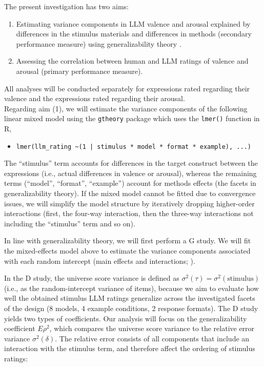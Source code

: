 \documentclass[12pt]{article}
\begin{document}
	\begin{examplebox}
		The present investigation has two aims:
		
		\begin{enumerate}
			\item Estimating variance components in LLM valence and arousal explained by differences in the stimulus materials and differences in methods (secondary performance measure) using generalizability theory \parencite{brennanGeneralizabilityTheory2001}.
			\item Assessing the correlation between human and LLM ratings of valence and arousal (primary performance measure).
		\end{enumerate}
		
		All analyses will be conducted separately for expressions rated regarding their valence and the expressions rated regarding their arousal. \\
		
		Regarding aim (1), we will estimate the variance components of the following linear mixed model using the \texttt{gtheory} package \parencite{mooreGtheoryApplyGeneralizability2016} which uses the \verb|lmer()| function in R,
		
		\begin{itemize}
			\item \texttt{lmer(llm\_rating \textasciitilde  (1 | stimulus * model * format * example), ...)}
		\end{itemize}
		
		The ``stimulus'' term accounts for differences in the target construct between the expressions (i.e., actual differences in valence or arousal), whereas the remaining terms (``model'', ``format'', ``example'') account for methods effects (the facets in generalizability theory). If the mixed model cannot be fitted due to convergence issues, we will simplify the model structure by iteratively dropping higher-order interactions (first, the four-way interaction, then the three-way interactions not including the “stimulus” term and so on). 
		
		In line with generalizability theory, we will first perform a G study. We will fit the mixed-effects model above to estimate the variance components associated with each random intercept (main effects and interactions; \cite{brennanGeneralizabilityTheory2001}).
		
		In the D study, the universe score variance is defined as $\sigma^2(\tau)=\sigma^2(\text{stimulus})$ (i.e., as the random-intercept variance of items), because we aim to evaluate how well the obtained stimulus LLM ratings generalize across the investigated facets of the design (8 models, 4 example conditions, 2 response formats). The D study yields two types of coefficients. Our analysis will focus on the generalizability coefficient $E\rho^2$, which compares the universe score variance to the relative error variance $\sigma^2(\delta)$. The relative error consists of all components that include an interaction with the stimulus term, and therefore affect the ordering of stimulus ratings:
		

\end{examplebox}
\end{document}
